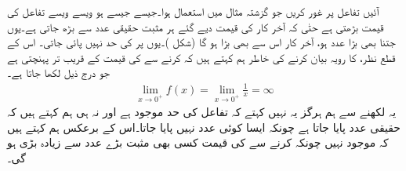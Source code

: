 آئیں تفاعل  پر غور کریں جو گزشتہ مثال میں استعمال ہوا۔جیسے جیسے  ہو  ویسے ویسے تفاعل  کی قیمت بڑھتی ہے  حتٰی کہ آخر کار  کی قیمت دیے گئے ہر مثبت حقیقی عدد  سے بڑھ جاتی ہے۔یوں  جتنا بھی بڑا عدد ہو،  آخر کار اس سے بھی بڑا ہو گا (شکل )۔یوں  پر  کی  حد نہیں  پائی جاتی۔ اس کے قطع نظر،  کا رویہ بیان کرنے کی خاطر  ہم کہتے ہیں کہ  کرنے سے  کی قیمت  کے قریب تر  پہنچتی ہے جو درج ذیل لکھا جاتا ہے۔
\begin{align*}
\lim_{x\to 0^+}f(x)=\lim_{x\to 0^+}\frac{1}{x}=\infty
\end{align*}
یہ لکھنے سے ہم ہرگز یہ نہیں کہتے   کہ تفاعل کی حد موجود ہے اور نہ ہی ہم کہتے ہیں کہ   حقیقی عدد  پایا جاتا ہے چونکہ ایسا کوئی عدد نہیں پایا جاتا۔اس کے برعکس ہم کہتے ہیں کہ  موجود نہیں   چونکہ  کرنے سے  کی قیمت کسی بھی مثبت بڑے عدد سے زیادہ بڑی ہو گی۔

